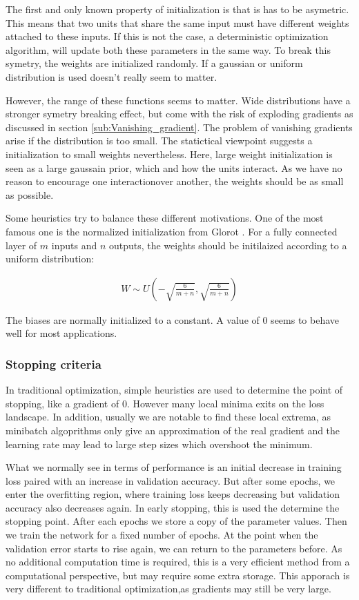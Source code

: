 The first and only known property of initialization is that is has to be
asymetric. This means that two units that share the same input must have
different weights attached to these inputs. If this is not the case, a
deterministic optimization algorithm, will update both these parameters in the
same way. To break this symetry, the weights are initialized randomly. If a
gaussian or uniform distribution is used doesn't really seem to matter.

However, the range of these functions seems to matter. Wide distributions have a
stronger symetry breaking effect, but come with the risk of exploding gradients
as discussed in section \ref{sub:Vanishing_gradient}. The problem of vanishing
gradients arise if the distribution is too small. The statictical viewpoint
suggests a initialization to small weights nevertheless. Here, large weight
initialization is seen as a large gaussain prior, which and how the units
interact. As we have no reason to encourage one interactionover another, the
weights should be as small as possible. 

Some heuristics try to balance these different motivations. One of the most
famous one is the normalized initialization from Glorot
\cite{glorot2010understanding}. For a fully connected layer of $m$ inputs and
$n$ outputs, the weights should be initilaized according to a uniform
distribution:

\begin{align}
    W \sim U(-\sqrt{\frac{6}{m+n}}, \sqrt{\frac{6}{m+n}})
\end{align}

The biases are normally initialized to a constant. A value of 0 seems to behave
well for most applications.




\subsubsection{Stopping criteria}\label{sub:Stopping_criteria}
In traditional optimization, simple heuristics are used to determine the point
of stopping, like a gradient of 0. However many local minima exits on the loss
landscape. In addition, usually we are notable to find these local extrema, as
minibatch algoprithms only give an approximation of the real gradient and the
learning rate may lead to large step sizes which overshoot the minimum.

What we normally see in terms of performance is an initial decrease in training
loss paired with an increase in validation accuracy. But after some epochs, we
enter the overfitting region, where training loss keeps decreasing but
validation accuracy also decreases again. In early stopping, this is used the
determine the stopping point. After each epochs we store a copy of the parameter
values. Then we train the network for a fixed number of epochs. At the point when
the validation error starts to rise again, we can return to the parameters
before. As no additional computation time is required, this is a very efficient
method from a computational perspective, but may require some extra storage.
This apporach is very different to traditional optimization,as gradients may
still be very large.



